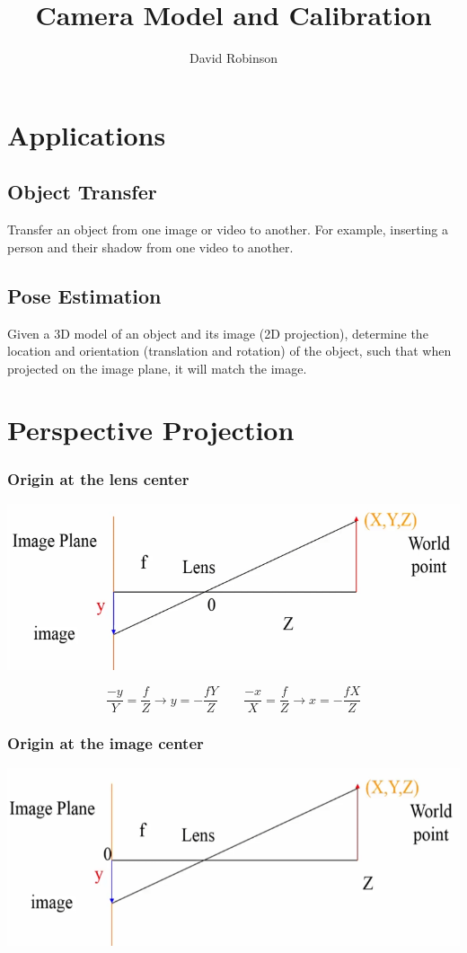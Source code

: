 \documentclass{article}
\title{Camera Model and Calibration}
\author{David Robinson}
\date{}
\begin{document}
\maketitle

\section*{Applications}
\subsection*{Object Transfer}
Transfer an object from one image or video to another. For example, inserting a person and their shadow from one video to another.

\subsection*{Pose Estimation}
Given a 3D model of an object and its image (2D projection), determine the location and orientation (translation and rotation) of the object, such that when projected on the image plane, it will match the image.

\section*{Perspective Projection}
\subsubsection*{Origin at the lens center}
\includegraphics[scale=0.65]{perspective_lens.png}

\[\frac{-y}{Y}=\frac{f}{Z}\rightarrow y=-\frac{fY}{Z}\quad\quad \frac{-x}{X}=\frac{f}{Z}\rightarrow x =-\frac{fX}{Z}\]

\subsubsection*{Origin at the image center}
\includegraphics[scale=0.5]{perspective_image.png}
\end{document}
